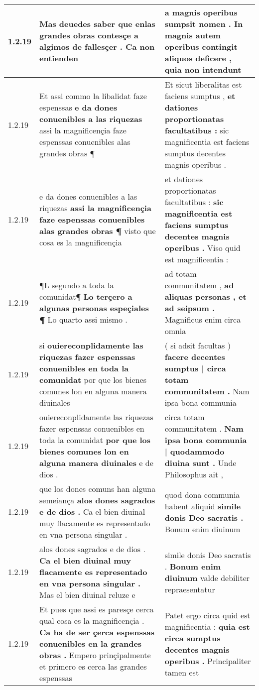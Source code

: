 \begin{tabular}{|p{1cm}|p{6.5cm}|p{6.5cm}|}
1.2.19 & Mas deuedes saber \textbf{ que enlas grandes obras contesçe a algimos de fallesçer . } Ca non entienden & a magnis operibus sumpsit nomen . \textbf{ In magnis autem operibus contingit aliquos deficere , } quia non intendunt \\\hline
1.2.19 & Et assi commo la libalidat faze espenssas \textbf{ e da dones conuenibles a las riquezas } assi la magnificençia faze espenssas conuenibles alas grandes obras ¶ & Et sicut liberalitas est faciens sumptus , \textbf{ et dationes proportionatas facultatibus : } sic magnificentia est faciens sumptus decentes magnis operibus . \\\hline
1.2.19 & e da dones conuenibles a las riquezas \textbf{ assi la magnificençia faze espenssas conuenibles alas grandes obras ¶ } visto que cosa es la magnificençia & et dationes proportionatas facultatibus : \textbf{ sic magnificentia est faciens sumptus decentes magnis operibus . } Viso quid est magnificentia : \\\hline
1.2.19 & ¶L segundo a toda la comunidat¶ \textbf{ Lo terçero a algunas personas espeçiales ¶ } Lo quarto assi mismo . & ad totam communitatem , \textbf{ ad aliquas personas , et ad seipsum . } Magnificus enim circa omnia \\\hline
1.2.19 & si \textbf{ ouiereconplidamente las riquezas fazer espenssas conuenibles en toda la comunidat } por que los bienes comunes lon en alguna manera diuinales & ( si adsit facultas ) \textbf{ facere decentes sumptus | circa totam communitatem . } Nam ipsa bona communia \\\hline
1.2.19 & ouiereconplidamente las riquezas fazer espenssas conuenibles en toda la comunidat \textbf{ por que los bienes comunes lon en alguna manera diuinales } e de dios . & circa totam communitatem . \textbf{ Nam ipsa bona communia | quodammodo diuina sunt . } Unde Philosophus ait , \\\hline
1.2.19 & que los dones comuns han alguna semeiança \textbf{ alos dones sagrados e de dios . } Ca el bien diuinal muy flacamente es representado en vna persona singular . & quod dona communia habent aliquid \textbf{ simile donis Deo sacratis . } Bonum enim diuinum \\\hline
1.2.19 & alos dones sagrados e de dios . \textbf{ Ca el bien diuinal muy flacamente es representado en vna persona singular . } Mas el bien diuinal reluze e & simile donis Deo sacratis . \textbf{ Bonum enim diuinum } valde debiliter repraesentatur \\\hline
1.2.19 & Et pues que assi es paresçe cerca qual cosa es la magnificençia . \textbf{ Ca ha de ser çerca espenssas conuenibles en la grandes obras . } Empero prinçipalmente et primero es cerca las grandes espenssas & Patet ergo circa quid est magnificentia : \textbf{ quia est circa sumptus decentes magnis operibus . } Principaliter tamen est \\\hline

\end{tabular}
